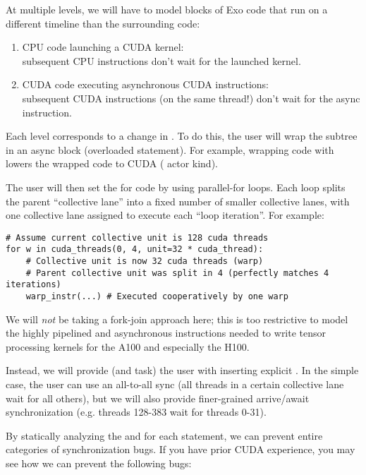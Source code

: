 \filbreak
At multiple levels, we will have to model blocks of Exo code that run on a different timeline than the surrounding code:
\begin{enumerate}
  \item CPU code launching a CUDA kernel:\\
  subsequent CPU instructions don't wait for the launched kernel.
  \item CUDA code executing asynchronous CUDA instructions:\\
  subsequent CUDA instructions (on the same thread!) don't wait for the async instruction.
\end{enumerate}

\filbreak
{} Each level corresponds to a change in .
To do this, the user will wrap the subtree in an async block (overloaded  statement).
For example, wrapping code with  lowers the wrapped code to CUDA ( actor kind).

\filbreak
{} The user will then set the  for code by using parallel-for loops.
Each loop splits the parent ``collective lane'' into a fixed number of smaller collective lanes, with one collective lane assigned to execute each ``loop iteration''. For example:

{\color{lightttColor}
\begin{verbatim}
# Assume current collective unit is 128 cuda threads
for w in cuda_threads(0, 4, unit=32 * cuda_thread):
    # Collective unit is now 32 cuda threads (warp)
    # Parent collective unit was split in 4 (perfectly matches 4 iterations)
    warp_instr(...) # Executed cooperatively by one warp
\end{verbatim}
}

\filbreak
{}
We will \textit{not} be taking a fork-join approach here; this is too restrictive to model the highly pipelined and asynchronous instructions needed to write tensor processing kernels for the A100 and especially the H100.

\filbreak
Instead, we will provide (and task) the user with inserting explicit .
In the simple case, the user can use an all-to-all sync (all threads in a certain collective lane wait for all others),
but we will also provide finer-grained arrive/await synchronization (e.g. threads 128-383 wait for threads 0-31).

\filbreak
By statically analyzing the  and  for each statement, we can prevent entire categories of synchronization bugs.
If you have prior CUDA experience, you may see how we can prevent the following bugs:

